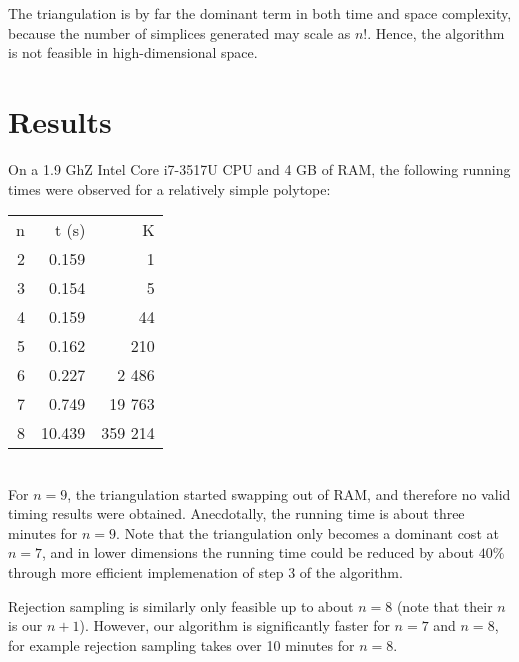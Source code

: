\documentclass[11pt]{article}
\begin{document}
The triangulation is by far the dominant term in both time and space complexity, because the number of simplices generated may scale as $n!$.
Hence, the algorithm is not feasible in high-dimensional space.

\section{Results}

On a 1.9 GhZ Intel Core i7-3517U CPU and 4 GB of RAM, the following running times were observed for a relatively simple polytope: \\
\begin{tabular}{rrr}
	n & t (s) & K \\
	2 & 0.159 & 1 \\
	3 & 0.154 & 5 \\
	4 & 0.159 & 44 \\
	5 & 0.162 & 210 \\
	6 & 0.227 & 2 486 \\
	7 & 0.749 & 19 763 \\
	8 & 10.439 & 359 214
\end{tabular} \\
For $n=9$, the triangulation started swapping out of RAM, and therefore no valid timing results were obtained.
Anecdotally, the running time is about three minutes for $n=9$.
Note that the triangulation only becomes a dominant cost at $n=7$, and in lower dimensions the running time could be reduced by about $40\%$ through more efficient implemenation of step 3 of the algorithm.

Rejection sampling is similarly only feasible up to about $n=8$ \cite{hitandrun} (note that their $n$ is our $n + 1$).
However, our algorithm is significantly faster for $n=7$ and $n=8$, for example rejection sampling takes over 10 minutes for $n=8$.



\end{document}
